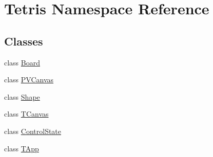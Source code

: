 \hypertarget{namespace_tetris}{\section{Tetris Namespace Reference}
\label{namespace_tetris}
}
\subsection*{Classes}
\begin{DoxyCompactItemize}
\item 
class \hyperlink{class_tetris_1_1_board}{Board}
\item 
class \hyperlink{class_tetris_1_1_p_v_canvas}{P\-V\-Canvas}
\item 
class \hyperlink{class_tetris_1_1_shape}{Shape}
\item 
class \hyperlink{class_tetris_1_1_t_canvas}{T\-Canvas}
\item 
class \hyperlink{class_tetris_1_1_control_state}{Control\-State}
\item 
class \hyperlink{class_tetris_1_1_t_app}{T\-App}
\end{DoxyCompactItemize}
